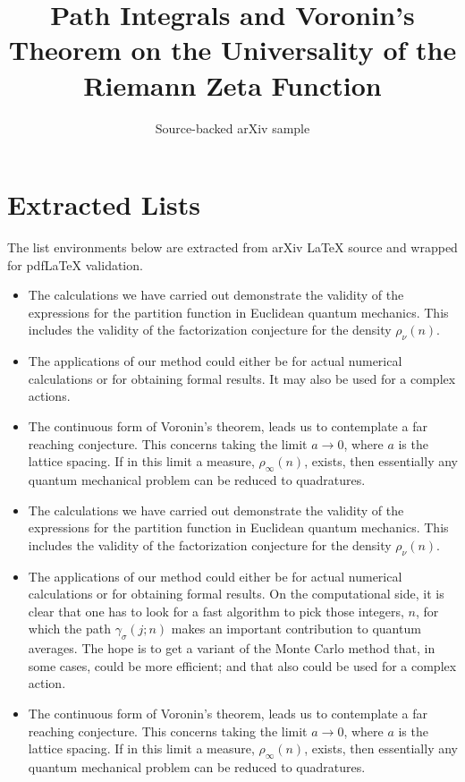 \documentclass[11pt]{article}
\title{Path Integrals and Voronin's Theorem on the Universality of the Riemann
  Zeta Function}
\author{Source-backed arXiv sample}
\date{}
\begin{document}
\maketitle
\section{Extracted Lists}

The list environments below are extracted from arXiv LaTeX source and wrapped for pdfLaTeX validation.

\begin{itemize}
\item[(i)]  {The calculations we have carried out
demonstrate the validity of the expressions for the partition function in
Euclidean quantum mechanics.  This includes the validity of the factorization
conjecture for the density $\rho_\nu(n)$. }

\item[(ii)]  The applications of our
method could either be for actual numerical calculations or for obtaining
formal results.   It may also be used for a complex actions.

\item[(iii)]  The continuous form of Voronin's theorem, 
leads us to contemplate a far reaching conjecture.  This
concerns taking the limit $a\rightarrow 0$, where $a$ is the lattice
spacing.  If in this limit a measure, $\rho_\infty (n)$, exists, then
essentially any quantum mechanical problem can be reduced to quadratures. 
\end{itemize}

\begin{itemize}

\item[(i)]  {The calculations we have carried out
demonstrate the validity of the expressions for the partition function in
Euclidean quantum mechanics.  This includes the validity of the factorization
conjecture for the density $\rho_\nu(n)$. }

\item[(ii)]  The applications of our
method could either be for actual numerical calculations or for obtaining
formal results.  On the computational side, it is clear that one has to look
for a fast algorithm to pick those integers, $n$, for which the path
$\gamma_{\sigma} (j;n)$ makes an important contribution to
quantum averages.  The hope is to get a variant of the Monte Carlo method
that, in some cases, could be more efficient; and that also could be used
for a complex action.

\item[(iii)]  The continuous form of Voronin's theorem, 
leads us to contemplate a far reaching conjecture.  This
concerns taking the limit $a\rightarrow 0$, where $a$ is the lattice
spacing.  If in this limit a measure, $\rho_\infty (n)$, exists, then
essentially any quantum mechanical problem can be reduced to quadratures. 
\end{itemize}
\end{document}

